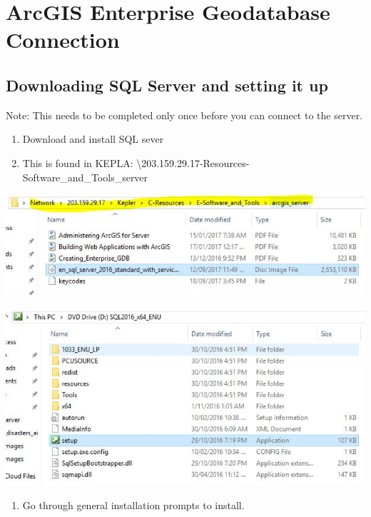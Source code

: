 \documentclass[]{book}
\providecommand{\tightlist}{%
  \setlength{\itemsep}{0pt}\setlength{\parskip}{0pt}}
\theoremstyle{definition}
\theoremstyle{definition}
\theoremstyle{definition}
\theoremstyle{remark}
\begin{document}
\section{ArcGIS Enterprise Geodatabase
Connection}\label{arcgis-enterprise-geodatabase-connection}

\subsection{Downloading SQL Server and setting it
up}\label{downloading-sql-server-and-setting-it-up}

Note: This needs to be completed only once before you can connect to the
server.

\begin{enumerate}
\def\labelenumi{\arabic{enumi}.}
\tightlist
\item
  Download and install SQL sever
\item
  This is found in KEPLA:
  \textbackslash{}203.159.29.17\Kepler\C-Resources\E-Software\_and\_Tools\arcgis\_server
\end{enumerate}

\begin{center}\includegraphics[width=0.7\linewidth]{img/fig43_arcgis1} \end{center}

\begin{center}\includegraphics[width=0.7\linewidth]{img/fig43_arcgis2} \end{center}

\begin{enumerate}
\def\labelenumi{\arabic{enumi}.}
\setcounter{enumi}{2}
\tightlist
\item
  Go through general installation prompts to install.
\end{enumerate}
\end{document}
